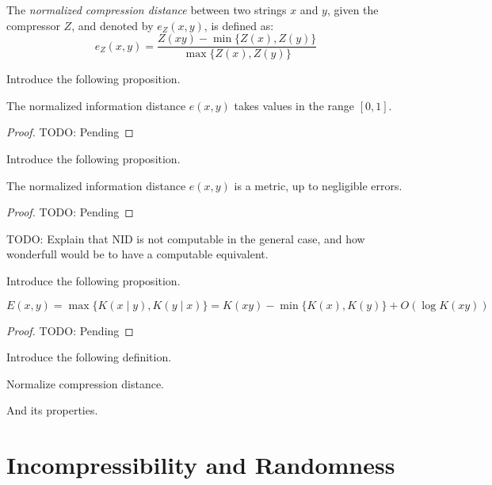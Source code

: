 \begin{definition}
The \emph{normalized compression distance} between two strings $x$ and $y$, given the compressor $Z$, and denoted by $e_Z(x, y)$, is defined as:
\[
e_Z(x, y) = \frac{ Z(xy) - \min\{ Z(x), Z(y) \}}{\max \{ Z(x), Z(y) \} }
\]
\end{definition}

{\color{red} Introduce the following proposition.}

\begin{proposition}
\label{prop:ncd_between_zero_and_one}
The normalized information distance $e(x, y)$ takes values in the range $[0, 1]$.
\end{proposition}
\begin{proof}
{\color{red} TODO: Pending}
\end{proof}

{\color{red} Introduce the following proposition.}

\begin{proposition}
The normalized information distance $e(x, y)$ is a metric, up to negligible errors.
\end{proposition}
\begin{proof}
{\color{red} TODO: Pending}
\end{proof}

{\color{red} TODO: Explain that NID is not computable in the general case, and how wonderfull would be to have a computable equivalent.}

{\color{red} Introduce the following proposition.}

\begin{proposition}
\[
E(x, y) = \max\{ K(x \mid y), K(y \mid x) \} = K(xy) - \min\{ K(x), K(y) \} + O(\log K(xy) )
\]
\end{proposition}
\begin{proof}
{\color{red} TODO: Pending}
\end{proof}

{\color{red} Introduce the following definition.}

\begin{definition}
Normalize compression distance.
\end{definition}

{\color{red} And its properties.}


%
%

\section{Incompressibility and Randomness}
\label{sec:incompressibility_randomness}

